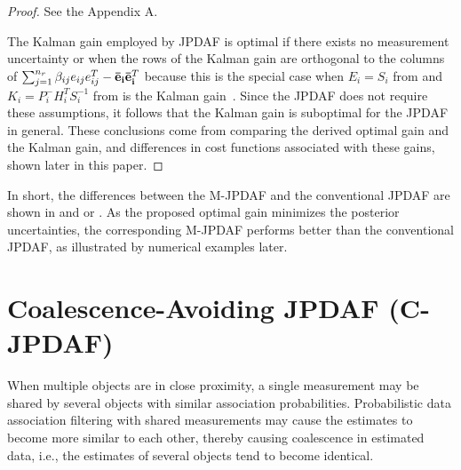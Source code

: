 \begin{proof}
See the Appendix A.

The Kalman gain employed by JPDAF is optimal if there exists no measurement uncertainty or when the rows of the Kalman gain are orthogonal to the columns of $\sum_{j=1}^{n_r}\beta_{ij}e_{ij}e_{ij}^T-{\bf\bar{e}_i}{\bf\bar{e}_i}^T$ because this is the special case when $E_i=S_i$ from  and $K_i=P^-_iH_i^TS_i^{-1}$ from  is the Kalman gain~\cite{OptEst1}.
Since the JPDAF does not require these assumptions, it follows that the Kalman gain is suboptimal for the JPDAF in general.
These conclusions come from comparing the derived optimal gain and the Kalman gain, and differences in cost functions associated with these gains, shown later in this paper.

%
%
\end{proof}


In short, the differences between the M-JPDAF and the conventional JPDAF are shown in  and  or .
As the proposed optimal gain minimizes the posterior uncertainties, the corresponding M-JPDAF performs better than the conventional JPDAF, as illustrated by numerical examples later.


\section{Coalescence-Avoiding JPDAF (C-JPDAF)}
\label{sec:C-JPDAF}




When multiple objects are in close proximity, a single measurement may be shared by several objects with similar association probabilities.
Probabilistic data association filtering with shared measurements may cause the estimates to become more similar to each other, thereby causing coalescence in estimated data, i.e., the estimates of several objects tend to become identical.

